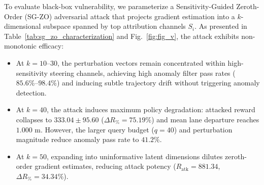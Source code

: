 \documentclass[conference]{IEEEtran}
\begin{document}
\begin{table}[!t]
\centering
\caption{Sensitivity-Guided Zeroth-Order (SG-ZO) Parametric Characterization}
\label{tab:sg_zo_characterization}
\end{table}

To evaluate black-box vulnerability, we parameterize a Sensitivity-Guided Zeroth-Order (SG-ZO) adversarial attack that projects gradient estimation into a $k$-dimensional subspace spanned by top attribution channels $S_i$. As presented in Table~\ref{tab:sg_zo_characterization} and Fig.~\ref{fig:fig_v}, the attack exhibits non-monotonic efficacy:
\begin{itemize}
    \item At $k=10\text{--}30$, the perturbation vectors remain concentrated within high-sensitivity steering channels, achieving high anomaly filter pass rates ($85.6\%\text{--}98.4\%$) and inducing subtle trajectory drift without triggering anomaly detection.
    \item At $k=40$, the attack induces maximum policy degradation: attacked reward collapses to $333.04 \pm 95.60$ ($\Delta R_\% = 75.19\%$) and mean lane departure reaches $1.000\text{ m}$. However, the larger query budget ($q=40$) and perturbation magnitude reduce anomaly pass rate to $41.2\%$.
    \item At $k=50$, expanding into uninformative latent dimensions dilutes zeroth-order gradient estimates, reducing attack potency ($R_{\text{atk}} = 881.34$, $\Delta R_\% = 34.34\%$).
\end{itemize}
\end{document}
